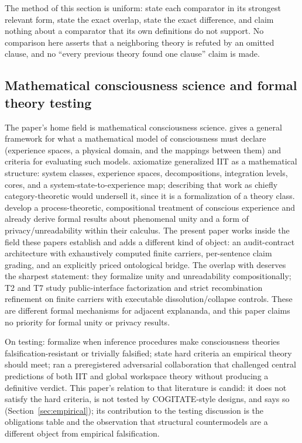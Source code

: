 \documentclass[11pt]{article}
\theoremstyle{definition}
\begin{document}
The method of this section is uniform: state each comparator in its strongest
relevant form, state the exact overlap, state the exact difference, and claim
nothing about a comparator that its own definitions do not support. No
comparison here asserts that a neighboring theory is refuted by an omitted
clause, and no ``every previous theory found one clause'' claim is made.

\subsection{Mathematical consciousness science and formal theory testing}

The paper's home field is mathematical consciousness science.
\citet{Kleiner2020MathematicalModels} gives a general framework for what a
mathematical model of consciousness must declare (experience spaces, a
physical domain, and the mappings between them) and criteria for evaluating
such models. \citet{KleinerTull2021} axiomatize generalized IIT as a
mathematical structure: system classes, experience spaces, decompositions,
integration levels, cores, and a system-state-to-experience map; describing
that work as chiefly category-theoretic would undersell it, since it is a
formalization of a theory class. \citet{SignorelliWangCoecke2021} develop a
process-theoretic, compositional treatment of conscious experience and
already derive formal results about phenomenal unity and a form of
privacy/unreadability within their calculus. The present paper works inside
the field these papers establish and adds a different kind of object: an
audit-contract architecture with exhaustively computed finite carriers,
per-sentence claim grading, and an explicitly priced ontological bridge. The
overlap with \citet{SignorelliWangCoecke2021} deserves the sharpest
statement: they formalize unity and unreadability compositionally; T2 and T7
study public-interface factorization and strict recombination refinement on
finite carriers with executable dissolution/collapse controls. These are
different formal mechanisms for adjacent explananda, and this paper claims no
priority for formal unity or privacy results.

On testing: \citet{KleinerHoel2021} formalize when inference procedures make
consciousness theories falsification-resistant or trivially falsified;
\citet{DoerigEtAl2020HardCriteria} state hard criteria an empirical theory
should meet; \citet{CogitateConsortium2025} ran a preregistered adversarial
collaboration that challenged central predictions of both IIT and global
workspace theory without producing a definitive verdict. This paper's
relation to that literature is candid: it does not
satisfy the hard criteria, is not tested by COGITATE-style designs, and says
so (Section~\ref{sec:empirical}); its contribution to the testing discussion
is the obligations table and the observation that structural countermodels
are a different object from empirical falsification.
\end{document}
